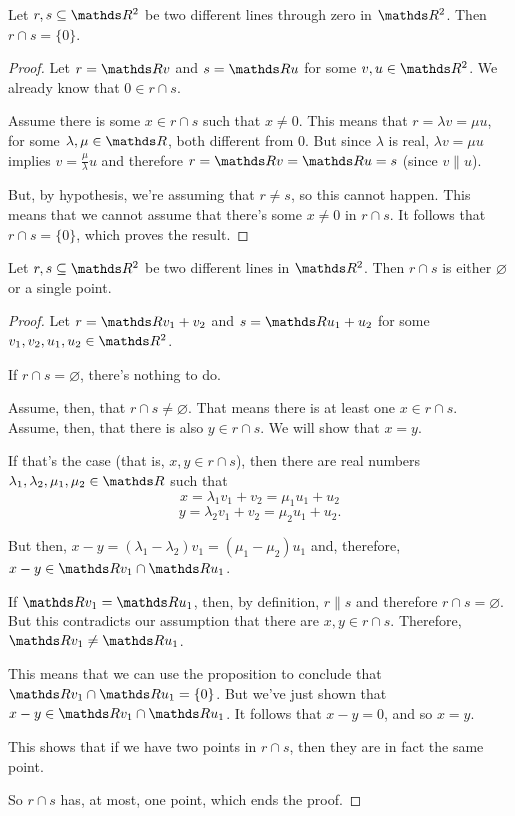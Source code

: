 \begin{prop}
	Let $r,s\subseteq \R^2$ be two different lines through zero in $\R^2$. Then $r\cap s=\{0\}$.
\end{prop}
\begin{proof}
	Let $r=\R v$ and $s=\R u$ for some $v,u\in \R^2$. We already know that $0\in r\cap s$.
	
	Assume there is some $x\in r\cap s$ such that $x\neq 0$. This means that $r=\lambda v=\mu u$, for some $\lambda,\mu\in\R$, both different from $0$. But since $\lambda$ is real, $\lambda v=\mu u$ implies $v=\frac{\mu}{\lambda }u$ and therefore $r=\R v=\R u=s$ (since $v\parallel u$).
	
	But, by hypothesis, we're assuming that $ r\neq s$, so this cannot happen. This means that we cannot assume that there's some $x\neq 0$ in $r\cap s$. It follows that $r\cap s=\{0\}$, which proves the result.
\end{proof}
\begin{cor}
	Let $r,s\subseteq \R^2$ be two different lines in $\R^2$. Then $r\cap s$ is either $\varnothing$ or a single point.
\end{cor}
\begin{proof}
	Let $r=\R v_1+v_2$ and $s=\R u_1+u_2$ for some $v_1,v_2,u_1,u_2\in \R^2$.
	
	If $r\cap s=\varnothing$, there's nothing to do.
	
	Assume, then, that $r\cap s\neq\varnothing$. That means there is at least one $x\in r\cap s$. Assume, then, that there is also $y\in r\cap s$. We will show that $x=y$.
	
	If that's the case (that is, $x,y\in r\cap s$), then there are real numbers $\lambda_1,\lambda_2,\mu_1,\mu_2\in\R$ such that
	\[x=\lambda_1v_1+v_2=\mu_1u_1+u_2\]
	\[y=\lambda_2v_1+v_2=\mu_2u_1+u_2.\]
	
	But then, $x-y=(\lambda_1-\lambda_2)v_1=(\mu_1-\mu_2)u_1$ and, therefore, $x-y\in\R v_1\cap \R u_1$.
	
	If $\R v_1=\R u_1$, then, by definition, $r\parallel s$ and therefore $r\cap s=\varnothing$. But this contradicts our assumption that there are $x,y\in r\cap s$. Therefore, $\R v_1\neq \R u_1$.
	
	This means that we can use the proposition to conclude that $\R v_1\cap \R u_1=\{0\}$. But we've just shown that $x-y\in \R v_1\cap \R u_1$. It follows that $x-y=0$, and so $x=y$.
	
	This shows that if we have two points in $r\cap s$, then they are in fact the same point.
	
	So $r\cap s$ has, at most, one point, which ends the proof.
\end{proof}

